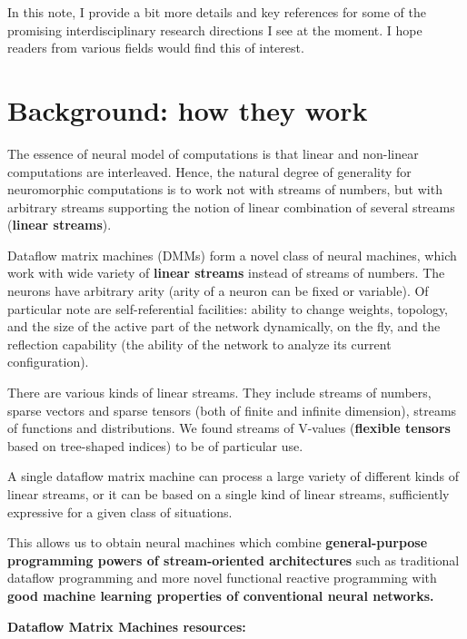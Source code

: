 \documentclass{article}
\begin{document}
In this note, I provide a bit more details and key references for some of the promising
interdisciplinary research directions I see at the moment. I hope readers from various
fields would find this of interest.

\vspace{-0.2in}

\tableofcontents

\section{Background: how they work}

The essence of neural model of computations is that linear and non-linear computations are interleaved. Hence, the natural
degree of generality for neuromorphic computations is to work not with streams of numbers, but with arbitrary streams
supporting the notion of linear combination of several streams ({\bf linear streams}).

Dataflow matrix machines (DMMs) form a novel class of neural machines, which work with wide variety
of {\bf linear streams} instead of streams of numbers. The neurons have
arbitrary arity (arity of a neuron can be fixed or variable). Of particular note are
self-referential facilities: ability to change weights, topology, and the size of the active part of the network dynamically, on the fly,
and the reflection capability (the ability of the network to analyze its current configuration).

There are various kinds of linear streams. They include streams of numbers, sparse vectors and sparse tensors (both of
finite and infinite dimension), streams of functions and distributions. We found streams of V-values
({\bf flexible tensors} based on tree-shaped indices) to be of particular use.

A single dataflow matrix machine can process a large variety of different kinds of linear streams, or
it can be based on a single kind of linear streams, sufficiently expressive for a given class of situations.

This allows us to obtain 
neural machines which combine {\bf general-purpose programming powers of stream-oriented
architectures} such as traditional dataflow programming and
more novel functional reactive programming with {\bf good machine learning
properties of conventional neural networks.}

\vspace{0.1in}
\noindent
{\bf Dataflow Matrix Machines resources:}
\end{document}
